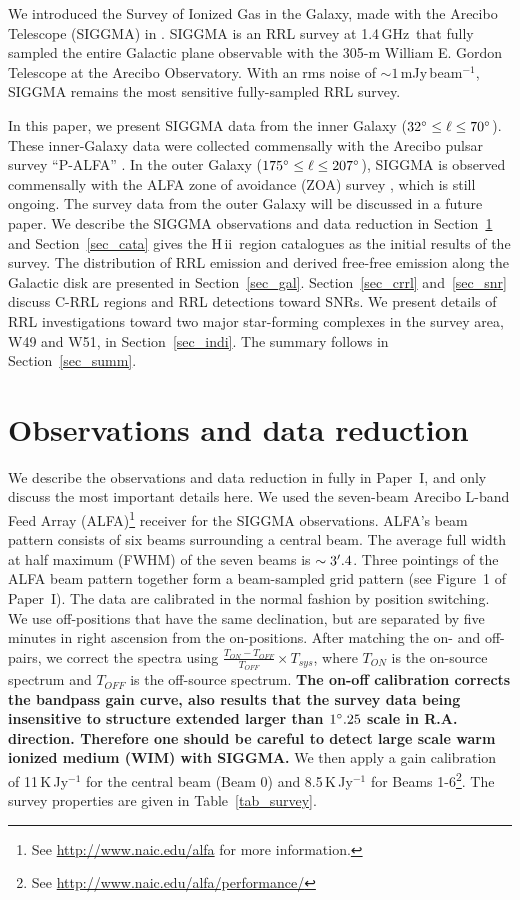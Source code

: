 \documentclass[manuscript]{aastex61}
\newcommand{\hii}{{\rm H\,}{{\sc ii}}}
\newcommand{\ghz}{\,GHz}
\begin{document}
We introduced the Survey of Ionized Gas in the Galaxy, made with the Arecibo Telescope (SIGGMA) in \citet[hereafter ``Paper I'']{Liu2013}.
SIGGMA is an RRL survey at 1.4\ghz\ that fully sampled the entire Galactic plane observable with the 305-m William E. Gordon Telescope at the Arecibo Observatory.
With an rms noise of $\sim1$\,mJy\,beam$^{-1}$, SIGGMA remains the most sensitive fully-sampled RRL survey.

In this paper, we present SIGGMA data from the inner Galaxy ($32 \mbox{$^\circ$} \leq \ell \leq 70 \mbox{$^\circ$}$).
These inner-Galaxy data were collected commensally with the Arecibo pulsar survey ``P-ALFA'' \citep{Cordes2006, Lazarus2015}.
In the outer Galaxy ($175 \mbox{$^\circ$} \leq \ell \leq 207 \mbox{$^\circ$} $), SIGGMA is observed commensally with the ALFA zone of avoidance (ZOA) survey \citep[][]{McIntyre2015}, which is still ongoing.
The survey data from the outer Galaxy will be discussed in a future paper. 
We describe the SIGGMA observations and data reduction in Section~\ref{sec_obs_data} and Section~\ref{sec_cata} gives the \hii\ region catalogues as the initial results of the survey. 
The distribution of RRL emission and derived free-free emission along the Galactic disk are presented in Section~\ref{sec_gal}.
Section~\ref{sec_crrl} and~\ref{sec_snr} discuss C-RRL regions and RRL detections toward SNRs.
We present details of RRL investigations toward two major star-forming complexes in the survey area, W49 and W51, in Section~\ref{sec_indi}.
The summary follows in Section~\ref{sec_summ}.

\section{Observations and data reduction} \label{sec_obs_data}

We describe the observations and data reduction in fully in Paper~I, and only discuss the most important details here.
We used the seven-beam Arecibo L-band Feed Array (ALFA)\footnote{See \url{http://www.naic.edu/alfa} for more information.} receiver for the SIGGMA observations.
ALFA's beam pattern consists of six beams surrounding a central beam.
The average full width at half maximum (FWHM) of the seven beams is $\sim3\mbox{$^\prime$}.4$.
Three pointings of the ALFA beam pattern together form a beam-sampled grid pattern (see Figure~1 of Paper~I).
The data are calibrated in the normal fashion by position switching. 
We use off-positions that have the same declination, but are separated by five minutes in right ascension from the on-positions.
After matching the on- and off-pairs, we correct the spectra using  $\frac{T_{ON}-T_{OFF}}{T_{OFF}}\times T_{sys}$, where $T_{ON}$ is the on-source spectrum and $T_{OFF}$ is the off-source spectrum.
\textbf{The on-off calibration corrects the bandpass gain curve, also results that the survey data being insensitive to structure extended larger than $1\mbox{$^\circ$}.25$ scale in R.A. direction.
Therefore one should be careful to detect large scale warm ionized medium (WIM) with SIGGMA.}
We then apply a gain calibration of 11\,K\,Jy$^{-1}$ for the central beam (Beam 0) and 8.5\,K\,Jy$^{-1}$ for Beams 1-6\footnote{See \url{http://www.naic.edu/alfa/performance/}}.
The survey properties are given in Table~\ref{tab_survey}.
\end{document}
